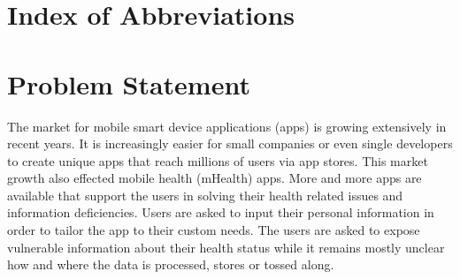 \documentclass[
	a4paper,
	oneside,
	12pt,
	liststotocnumbered
]{article}
\begin{document}
\renewcommand{\figurename}{Figure}
\renewcommand{\tablename}{Table}
\renewcommand\thefigure{\arabic{section}-\arabic{figure}}
\renewcommand\thetable{Tab. \arabic{section}-\arabic{table}}
\newcommand{\todo}[1]{\textbf{\textsc{\textcolor{red}{TODO: #1}}}}

\newcommand{\mH}{mHealth }
\newcommand{\ap}{app provider}
\newcommand{\pp}{privacy policy}
\newcommand{\pps}{privacy policies}
\newcommand{\sca}{static code analysis}
\newcommand{\Sca}{Static code analysis}




\tableofcontents
\newpage

\section*{Index of Abbreviations}
\begin{acronym}[TTTTTTTTTTTTTTTTTTTT]
\end{acronym}
\newpage

\normalsize
{}

\section{Problem Statement}
The market for mobile smart device applications (apps) is growing extensively in recent years. 
It is increasingly easier for small companies or even single developers to create unique apps that reach millions of users via app stores.
This market growth also effected mobile health (\acs{mHealth}) apps. 
More and more apps are available that support the users in solving their health related issues and information deficiencies. 
Users are asked to input their personal information in order to tailor the app to their custom needs. 
The users are asked to expose vulnerable information about their health status while it remains mostly unclear how and where the data is processed, stores or tossed along.
\end{document}
